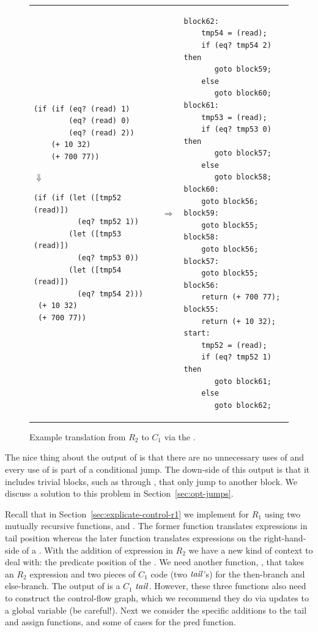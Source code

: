 \documentclass[11pt]{book}
\begin{document}
\begin{figure}[tbp]
\begin{tabular}{lll}
\begin{minipage}{0.4\textwidth}
\begin{lstlisting}
(if (if (eq? (read) 1)
        (eq? (read) 0)
        (eq? (read) 2))
    (+ 10 32)
    (+ 700 77))
\end{lstlisting}
\hspace{40pt}$\Downarrow$
\begin{lstlisting}
(if (if (let ([tmp52 (read)])
          (eq? tmp52 1))
        (let ([tmp53 (read)]) 
          (eq? tmp53 0))
        (let ([tmp54 (read)]) 
          (eq? tmp54 2)))
 (+ 10 32)
 (+ 700 77))
\end{lstlisting}
\end{minipage}
&
$\Rightarrow$
&
\begin{minipage}{0.55\textwidth}
\begin{lstlisting}
block62:
    tmp54 = (read);
    if (eq? tmp54 2) then
       goto block59;
    else
       goto block60;
block61:
    tmp53 = (read);
    if (eq? tmp53 0) then
       goto block57;
    else
       goto block58;
block60:
    goto block56;
block59:
    goto block55;
block58:
    goto block56;
block57:
    goto block55;
block56:
    return (+ 700 77);
block55:
    return (+ 10 32);
start:
    tmp52 = (read);
    if (eq? tmp52 1) then
       goto block61;
    else
       goto block62;
\end{lstlisting}
\end{minipage}
\end{tabular} 

\caption{Example translation from $R_2$ to $C_1$
  via the .}
\label{fig:explicate-control-s1-38}
\end{figure}

The nice thing about the output of  is that
there are no unnecessary uses of  and every use of
 is part of a conditional jump. The down-side of this output
is that it includes trivial blocks, such as  through
, that only jump to another block. We discuss a solution
to this problem in Section~\ref{sec:opt-jumps}.

Recall that in Section~\ref{sec:explicate-control-r1} we implement
 for $R_1$ using two mutually recursive
functions,  and .  The
former function translates expressions in tail position whereas the
later function translates expressions on the right-hand-side of a
. With the addition of  expression in $R_2$ we have a
new kind of context to deal with: the predicate position of the
. We need another function, , that takes
an $R_2$ expression and two pieces of $C_1$ code (two $\mathit{tail}$'s) for
the then-branch and else-branch. The output of 
is a $C_1$ $\mathit{tail}$.  However, these three functions also need to
construct the control-flow graph, which we recommend they do via
updates to a global variable (be careful!). Next we consider the
specific additions to the tail and assign functions, and some of cases
for the pred function.
\end{document}
